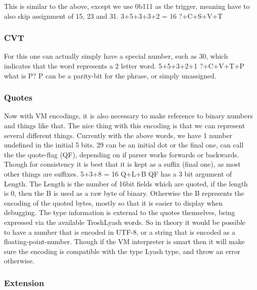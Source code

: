 This is similar to the above, except we use 0b111 as the trigger,
meaning have to also skip assignment of 15, 23 and 31. 3+5+3+3+2 = 16
?+C+S+V+T

\subsubsection{CVT}\label{cvt}

For this one can actually simply have a special number, such as 30,
which indicates that the word represents a 2 letter word. 5+5+3+2+1
?+C+V+T+P what is P? P can be a parity-bit for the phrase, or simply
unassigned.

\subsubsection{Quotes}\label{quotes}

Now with VM encodings, it is also necessary to make reference to binary
numbers and things like that. The nice thing with this encoding is that
we can represent several different things. Currently with the above
words, we have 1 number undefined in the initial 5 bits. 29 can be an
initial dot or the final one, can call the the quote-flag (QF),
depending on if parser works forwards or backwards. Though for
consistency it is best that it is kept as a suffix (final one), as most
other things are suffixes. 5+3+8 = 16 Q+L+B QF has a 3 bit argument of
Length. The Length is the number of 16bit fields which are quoted, if
the length is 0, then the B is used as a raw byte of binary. Otherwise
the B represents the encoding of the quoted bytes, mostly so that it is
easier to display when debugging. The type information is external to
the quotes themselves, being expressed via the available TroshLyash
words. So in theory it would be possible to have a number that is
encoded in UTF-8, or a string that is encoded as a
floating-point-number. Though if the VM interpreter is smart then it
will make sure the encoding is compatible with the type Lyash type, and
throw an error otherwise.

\subsubsection{Extension}\label{extension}

